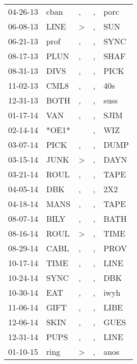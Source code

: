 \begin{supertabular}{lllll}
 04-26-13 &   cban &                , &             , &   porc \\
 06-08-13 &   LINE &     \textgreater &             , &    SUN \\
 06-21-13 &   prof &                , &             , &   SYNC \\
 08-17-13 &   PLUN &                , &             , &   SHAF \\
 08-31-13 &   DIVS &                , &             , &   PICK \\
 11-02-13 &   CML8 &                , &             , &    40s \\
 12-31-13 &   BOTH &                , &             , &   suss \\
 01-17-14 &    VAN &                , &             , &   SJIM \\
 02-14-14 &  *OE1* &                  &             , &    WIZ \\
 03-07-14 &   PICK &                , &             , &   DUMP \\
 03-15-14 &   JUNK &     \textgreater &             , &   DAYN \\
 03-21-14 &   ROUL &                , &             , &   TAPE \\
 04-05-14 &    DBK &                , &             , &    2X2 \\
 04-18-14 &   MANS &                , &             , &   TAPE \\
 08-07-14 &   BILY &                , &             , &   BATH \\
 08-16-14 &   ROUL &     \textgreater &             , &   TIME \\
 08-29-14 &   CABL &                , &             , &   PROV \\
 10-17-14 &   TIME &                , &             , &   LINE \\
 10-24-14 &   SYNC &                , &             , &    DBK \\
 10-30-14 &    EAT &                , &             , &   iwyh \\
 11-06-14 &   GIFT &                , &             , &   LIBE \\
 12-06-14 &   SKIN &                , &             , &   GUES \\
 12-31-14 &   PUPS &                , &             , &   LINE \\
 01-10-15 &   ring &     \textgreater &             , &   anos \\

\end{supertabular}
